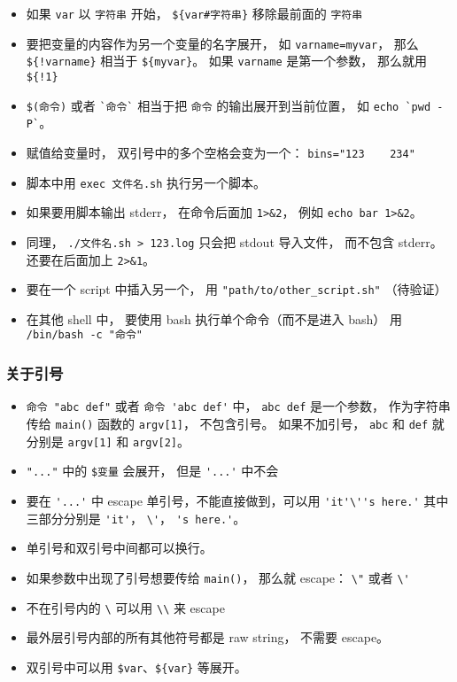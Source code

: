 \begin{itemize}
\item 如果 \verb`var` 以 \verb`字符串` 开始， \verb`${var#字符串}` 移除最前面的 \verb`字符串`
\item 要把变量的内容作为另一个变量的名字展开， 如 \verb`varname=myvar`， 那么 \verb`${!varname}` 相当于 \verb`${myvar}`。 如果 \verb`varname` 是第一个参数， 那么就用 \verb`${!1}`
\item \verb`$(命令)` 或者 \verb|`命令`| 相当于把 \verb`命令` 的输出展开到当前位置， 如 \verb|echo `pwd -P`|。
\item 赋值给变量时， 双引号中的多个空格会变为一个： \verb`bins="123    234"`
\item 脚本中用 \verb`exec 文件名.sh` 执行另一个脚本。
\item 如果要用脚本输出 stderr， 在命令后面加 \verb`1>&2`， 例如 \verb`echo bar 1>&2`。
\item 同理， \verb`./文件名.sh > 123.log` 只会把 stdout 导入文件， 而不包含 stderr。 还要在后面加上 \verb`2>&1`。
\item 要在一个 script 中插入另一个， 用 \verb`"path/to/other_script.sh"` （待验证）
\item 在其他 shell 中， 要使用 bash 执行单个命令（而不是进入 bash） 用 \verb`/bin/bash -c "命令"`
\end{itemize}

\subsubsection{关于引号}
\begin{itemize}
\item \verb`命令 "abc def"` 或者 \verb`命令 'abc def'` 中， \verb`abc def` 是一个参数， 作为字符串传给 \verb`main()` 函数的 \verb`argv[1]`， 不包含引号。 如果不加引号， \verb`abc` 和 \verb`def` 就分别是 \verb`argv[1]` 和 \verb`argv[2]`。
\item \verb`"..."` 中的 \verb`$变量` 会展开， 但是 \verb`'...'` 中不会
\item 要在 \verb`'...'` 中 escape 单引号，不能直接做到，可以用 \verb`'it'\''s here.'` 其中三部分分别是 \verb`'it'`， \verb`\'`， \verb`'s here.'`。
\item 单引号和双引号中间都可以换行。
\item 如果参数中出现了引号想要传给 \verb`main()`， 那么就 escape： \verb`\"` 或者 \verb`\'`
\item 不在引号内的 \verb`\` 可以用 \verb`\\` 来 escape
\item 最外层引号内部的所有其他符号都是 raw string， 不需要 escape。
\item 双引号中可以用 \verb`$var`、\verb`${var}` 等展开。
\end{itemize}

